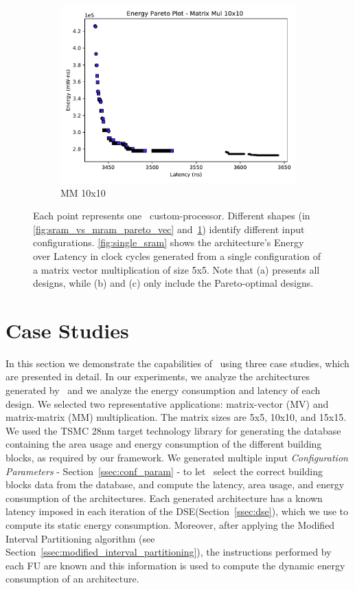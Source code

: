 \begin{figure}[ht]
\begin{subfigure}{.33\textwidth}
  \includegraphics[width=\textwidth]{graphs/EnergyParetoMatrixMul10.pdf}
  \caption{MM 10x10}
  \label{fig:sram_vs_mram_pareto_mul}
\end{subfigure}
    \caption{Each point represents one \frameworkname~custom-processor. Different shapes (in \ref{fig:sram_vs_mram_pareto_vec} and~\ref{fig:sram_vs_mram_pareto_mul}) identify different input configurations. \ref{fig:single_sram} shows the architecture's Energy over Latency in clock cycles generated from a single configuration of a matrix vector multiplication of size 5x5. Note that (a) presents all designs, while (b) and (c) only include the Pareto-optimal designs.}
\label{fig:case_studies_1}
\end{figure}
\section{Case Studies}
\label{sec:case_studies}
In this section we demonstrate the capabilities of \frameworkname~using three case studies, which are presented in detail. In our experiments, we analyze the architectures generated by \frameworkname~and we analyze the energy consumption and latency of each design.
We selected two representative applications: matrix-vector (MV) and matrix-matrix (MM) multiplication. The matrix sizes are 5x5, 10x10, and 15x15. We used the TSMC 28nm target technology library for generating the database containing the area usage and energy consumption of the different building blocks, as required by our framework.
We generated multiple input \textit{Configuration Parameters} - Section~\ref{ssec:conf_param} - to let \frameworkname~select the correct building blocks data from the database, and compute the latency, area usage, and energy consumption of the architectures. Each generated architecture has a known latency imposed in each iteration of the DSE(Section~\ref{ssec:dse}), which we use to compute its static energy consumption. Moreover, after applying the Modified Interval Partitioning algorithm (see Section~\ref{ssec:modified_interval_partitioning}), the instructions performed by each FU are known and this information is used to compute the dynamic energy consumption of an architecture. 


